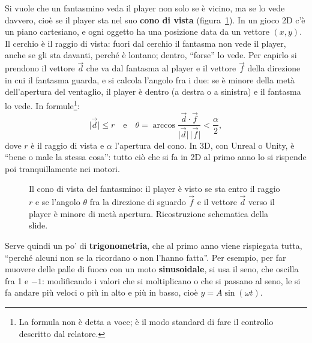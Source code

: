 Si vuole che un fantasmino veda il player non solo se è vicino, ma se lo vede
davvero, cioè se il player sta nel suo \textbf{cono di vista}
(figura~\ref{p5:fig:cono}). In un gioco 2D c'è un piano cartesiano, e ogni
oggetto ha una posizione data da un vettore $(x,y)$. Il cerchio è il raggio di
vista: fuori dal cerchio il fantasma non vede il player, anche se gli sta
davanti, perché è lontano; dentro, ``forse'' lo vede. Per capirlo si prendono
il vettore $\vec{d}$ che va dal fantasma al player e il vettore $\vec{f}$ della
direzione in cui il fantasma guarda, e si calcola l'angolo fra i due: se è
minore della metà dell'apertura del ventaglio, il player è dentro (a destra o a
sinistra) e il fantasma lo vede. In formule\footnote{La formula non è detta a
voce; è il modo standard di fare il controllo descritto dal relatore.}:
\[
  \lvert\vec{d}\rvert \le r
  \quad\text{e}\quad
  \theta=\arccos\frac{\vec{d}\cdot\vec{f}}{\lvert\vec{d}\rvert\,
  \lvert\vec{f}\rvert} < \frac{\alpha}{2},
\]
dove $r$ è il raggio di vista e $\alpha$ l'apertura del cono. In 3D, con
Unreal o Unity, è ``bene o male la stessa cosa'': tutto ciò che si fa in 2D al
primo anno lo si rispende poi tranquillamente nei motori.

\begin{figure}[htbp]
\centering
{}
\caption{Il cono di vista del fantasmino: il player è visto se sta entro il
raggio $r$ e se l'angolo $\theta$ fra la direzione di sguardo $\vec{f}$ e il
vettore $\vec{d}$ verso il player è minore di metà apertura. Ricostruzione
schematica della slide.}
\label{p5:fig:cono}
\end{figure}

Serve quindi un po' di \textbf{trigonometria}, che al primo anno viene
rispiegata tutta, ``perché alcuni non se la ricordano o non l'hanno fatta''.
Per esempio, per far muovere delle palle di fuoco con un moto
\textbf{sinusoidale}, si usa il seno, che oscilla fra 1 e $-1$: modificando i
valori che si moltiplicano o che si passano al seno, le si fa andare più veloci
o più in alto e più in basso, cioè $y = A\sin(\omega t)$.

